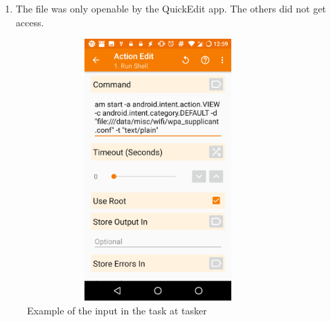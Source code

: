 \begin{enumerate}
\begin{enumerate}
        \item The file was only openable by the QuickEdit app. The others did not get access.
    \end{enumerate}
    \begin{figure}[H]
        \centering
        \includegraphics[width=10cm,height=10cm,keepaspectratio]{images/tasker.png}
        \caption{Example of the input in the task at tasker}
        \label{fig:my_label}
    \end{figure}
    
\end{enumerate}

